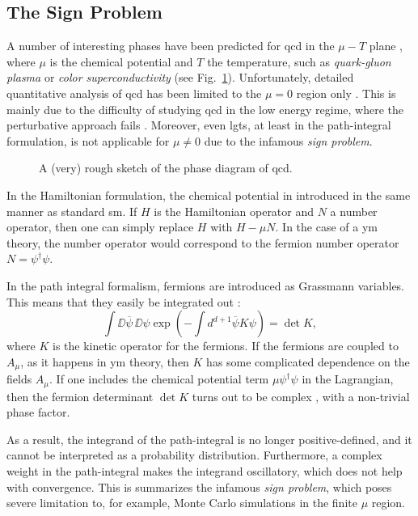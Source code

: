 \subsection{The Sign Problem}
\label{sub:the_sign_problem}

A number of interesting phases have been predicted for \ac{qcd} in the $\mu - T$ plane \cite{aarts2016qcd}, where $\mu$ is the chemical potential and $T$ the temperature, such as \emph{quark-gluon plasma} \cite{detar2009qcdthermo} or \emph{color superconductivity} \cite{alford2001coloursc} (see Fig.~\ref{fig:qcd_phase_diagram}).
Unfortunately, detailed quantitative analysis of \ac{qcd} has been limited to the $\mu = 0$ region only \cite{aarts2016qcd}.
This is mainly due to the difficulty of studying \ac{qcd} in the low energy regime, where the perturbative approach fails \cite{peskin1995qft, creutz1985book}.
Moreover, even \ac{lgt}s, at least in the path-integral formulation, is not applicable for $\mu \neq 0$ due to the infamous \emph{sign problem}.


\begin{figure}[t]
    \centering
    
    \caption{A (very) rough sketch of the phase diagram of \ac{qcd}.}
    \label{fig:qcd_phase_diagram}
\end{figure}


In the Hamiltonian formulation, the chemical potential in introduced in the same manner as standard \ac{sm}.
If $H$ is the Hamiltonian operator and $N$ a number operator, then one can simply replace $H$ with $H - \mu N$.
In the case of a \ac{ym} theory, the number operator would correspond to the fermion number operator $N = \psi^{\dagger} \psi$.

In the path integral formalism, fermions are introduced as Grassmann variables.
This means that they easily be integrated out \cite{peskin1995qft, aarts2016qcd}:
\begin{equation}
    \int \DD \overline{\psi}\, \DD \psi \exp(-\int d^{d+1} \overline{\psi} K \psi) = \det K,
\end{equation}
where $K$ is the kinetic operator for the fermions.
If the fermions are coupled to $A_{\mu}$, as it happens in \ac{ym} theory, then $K$ has some complicated dependence on the fields $A_{\mu}$.
If one includes the chemical potential term $\mu \psi^{\dagger} \psi$ in the Lagrangian, then the fermion determinant $\det K$ turns out to be complex \cite{aarts2016qcd}, with a non-trivial phase factor.

As a result, the integrand of the path-integral is no longer positive-defined, and it cannot be interpreted as a probability distribution.
Furthermore, a complex weight in the path-integral makes the integrand oscillatory, which does not help with convergence.
This is summarizes the infamous \emph{sign problem}, which poses severe limitation to, for example, Monte Carlo simulations in the finite $\mu$ region.
